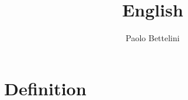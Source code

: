 \documentclass[a4paper]{article}
\title{English}
\author{Paolo Bettelini}
\date{}
\begin{document}
\maketitle
\tableofcontents
\pagebreak

\section{Definition}

\end{document}
